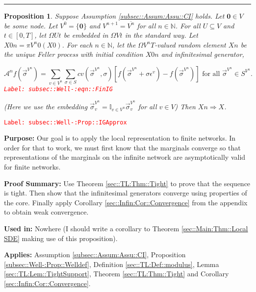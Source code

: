 \documentclass[12pt]{article}
\newcommand{\mb}{\mathbb}
\newcommand{\mc}{\mathcal}
\newcommand{\ov}{\overline}
\newcommand{\te}{\text}
\newcommand{\ep}{\epsilon}
\newcommand{\tr}{\textcolor{red}}
\newcommand{\labe}[1]{\tr{\texttt{Label: #1}}}
\newcommand{\purpose}{\textbf{Purpose: }}
\newcommand{\pfsum}{\textbf{Proof Summary: }}
\newcommand{\usein}{\textbf{Used in: }}
\newcommand{\app}{\textbf{Applies: }}
\newcommand{\lin}{\rule{\linewidth}{0.4 pt}}
\renewcommand{\root}{\mathbf{0}}				%
\renewcommand{\v}{v}							%
\renewcommand{\U}{U}							%
\renewcommand{\S}{S}							%
\newcommand{\s}{\sigma}							%
\newcommand{\sv}{\vec{\s}}						%
\newcommand{\ev}{\ep}							%
\newcommand{\T}{T}								%
\renewcommand{\t}{t}							%
\newcommand{\proj}{\pi}							%
\newcommand{\X}{X}								%
\newcommand{\IG}{\mc{A}}						%
\newcommand{\IGr}{c}							%
\newcommand{\vind}[1]{^{#1}}					%
\newcommand{\carp}[1]{^{#1}}					%
\newcommand{\vsi}[1]{^{#1}}						%
\newcommand{\cind}[1]{_{#1}}					%
\newcommand{\cl}{\ov}							%
\newcommand{\sln}[1]{^{#1}}						%
\newtheorem{prop}[thms]{Proposition}
\begin{document}
\lin

\begin{prop}
Suppose Assumption \ref{subsec::Assum:Assu::CI} holds. Let \(\root \in V\) be some node. Let \(V\sln{0} = \{\root\}\) and \(V\sln{n+1} = \cl{V\sln{n}}\) for all \(n \in \mb{N}\). For all \(\U \subseteq V\) and \(\t \in [0,\T]\), let \(\Omega{\U}{\t}\) be embedded in \(\Omega{V}{\t}\) in the standard way. Let \(\X{}{0}{n} = \proj{V\sln{n}}{0}(\X{}{0})\). For each \(n\in\mb{N}\), let the \(\Omega{V\sln{n}}{\T}\)-valued random element \(\X{}{}{n}\) be the unique Feller process with initial condition \(\X{}{0}{n}\) and infinitesimal generator,

\begin{equation}
\IG\sln{n}f(\sv\cind{}\vsi{V\sln{n}}) = \sum_{\v\in V\sln{n}}\sum_{\s\in \S} \IGr{\v}(\sv\cind{}\vsi{V\sln{n}}, \s)[f(\sv\cind{}\vsi{V\sln{n}} + \s\ev\vind{\v}) - f(\sv\cind{}\vsi{V\sln{n}})]\te{ for all } \sv\cind{}\vsi{V\sln{n}} \in \S\carp{V\sln{n}}.
\label{subsec::Well-:eqn::FinIG}
\end{equation}
\labe{subsec::Well-:eqn::FinIG}

(Here we use the embedding \(\sv\cind{\v}\vsi{V\sln{n}} = \mb{I}_{\v\in V\sln{n}} \sv\cind{\v}\vsi{V\sln{n}}\) for all \(\v \in V\)) Then \(\X{}{}{n} \Rightarrow \X{}{}\).
\label{subsec::Well-:Prop::IGApprox}
\end{prop}
\labe{subsec::Well-:Prop::IGApprox}

\purpose Our goal is to apply the local representation to finite networks. In order for that to work, we must first know that the marginals converge so that representations of the marginals on the infinite network are asymptotically valid for finite networks.

\pfsum Use Theorem \ref{sec::TL:Thm::Tight} to prove that the sequence is tight. Then show that the infinitesimal generators converge using properties of the core. Finally apply Corollary \ref{sec::Infin:Cor::Convergence} from the appendix to obtain weak convergence.

\usein Nowhere (I should write a corollary to Theorem \ref{sec::Main:Thm::Local SDE} making use of this proposition).

\app Assumption \ref{subsec::Assum:Assu::CI}, Proposition \ref{subsec::Well-:Prop::Welldef}, Definition \ref{sec::TL:Def::modulus}, Lemma \ref{sec::TL:Lem::TightSupport}, Theorem \ref{sec::TL:Thm::Tight} and Corollary \ref{sec::Infin:Cor::Convergence}.
\end{document}
